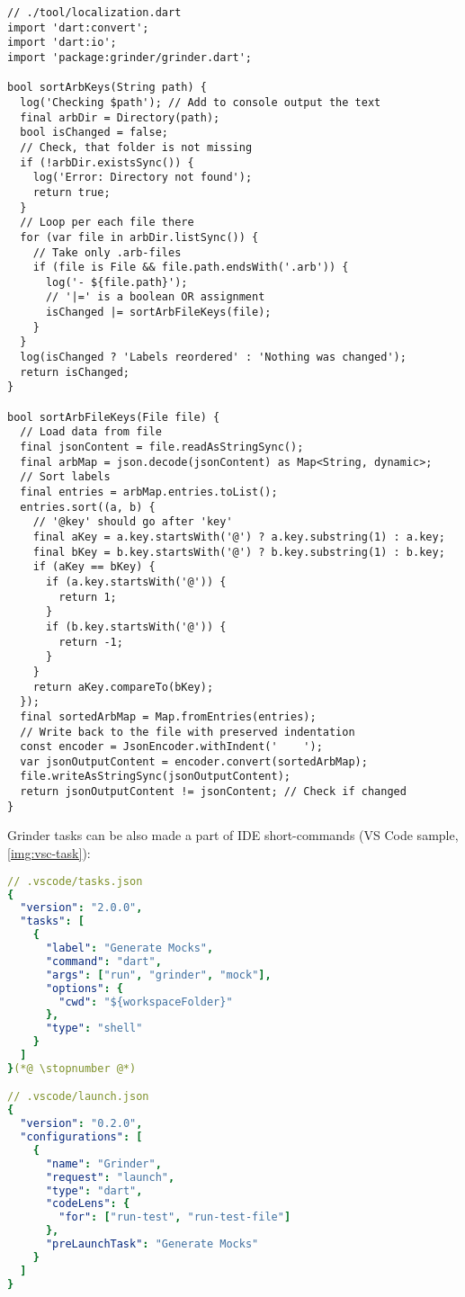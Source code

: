 \begin{lstlisting}
// ./tool/localization.dart
import 'dart:convert';
import 'dart:io';
import 'package:grinder/grinder.dart';

bool sortArbKeys(String path) {
  log('Checking $path'); // Add to console output the text
  final arbDir = Directory(path);
  bool isChanged = false;
  // Check, that folder is not missing
  if (!arbDir.existsSync()) {
    log('Error: Directory not found');
    return true;
  }
  // Loop per each file there
  for (var file in arbDir.listSync()) {
    // Take only .arb-files
    if (file is File && file.path.endsWith('.arb')) {
      log('- ${file.path}');
      // '|=' is a boolean OR assignment
      isChanged |= sortArbFileKeys(file);
    }
  }
  log(isChanged ? 'Labels reordered' : 'Nothing was changed');
  return isChanged;
}

bool sortArbFileKeys(File file) {
  // Load data from file
  final jsonContent = file.readAsStringSync();
  final arbMap = json.decode(jsonContent) as Map<String, dynamic>;
  // Sort labels
  final entries = arbMap.entries.toList();
  entries.sort((a, b) {
    // '@key' should go after 'key'
    final aKey = a.key.startsWith('@') ? a.key.substring(1) : a.key;
    final bKey = b.key.startsWith('@') ? b.key.substring(1) : b.key;
    if (aKey == bKey) {
      if (a.key.startsWith('@')) {
        return 1;
      }
      if (b.key.startsWith('@')) {
        return -1;
      }
    }
    return aKey.compareTo(bKey);
  });
  final sortedArbMap = Map.fromEntries(entries);
  // Write back to the file with preserved indentation
  const encoder = JsonEncoder.withIndent('    ');
  var jsonOutputContent = encoder.convert(sortedArbMap);
  file.writeAsStringSync(jsonOutputContent);
  return jsonOutputContent != jsonContent; // Check if changed
}
\end{lstlisting}

\noindent Grinder tasks can be also made a part of IDE short-commands (VS Code sample, \cref{img:vsc-task}):

\begin{lstlisting}[language=yaml]
// .vscode/tasks.json
{
  "version": "2.0.0",
  "tasks": [
    {
      "label": "Generate Mocks",
      "command": "dart",
      "args": ["run", "grinder", "mock"],
      "options": {
        "cwd": "${workspaceFolder}"
      },
      "type": "shell"
    }
  ]
}(*@ \stopnumber @*)

// .vscode/launch.json
{
  "version": "0.2.0",
  "configurations": [
    {
      "name": "Grinder",
      "request": "launch",
      "type": "dart",
      "codeLens": {
        "for": ["run-test", "run-test-file"]
      },
      "preLaunchTask": "Generate Mocks"
    }
  ]
}
\end{lstlisting}

